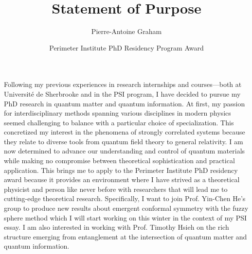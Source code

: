 \documentclass[12pt]{article}
\title{Statement of Purpose}
\author{Pierre-Antoine Graham}
\date{Perimeter Institute PhD Residency Program Award}
\begin{document}
\maketitle
\vspace{0.2cm}

Following my previous experiences in research internships and courses—both at Université de Sherbrooke and in the PSI program, I have decided to pursue my PhD research in quantum matter and quantum information. At first, my passion for interdisciplinary methods spanning various disciplines in modern physics seemed challenging to balance with a particular choice of specialization. This concretized my interest in the phenomena of strongly correlated systems because they relate to diverse tools from quantum field theory to general relativity. I am now determined to advance our understanding and control of quantum materials while making no compromise between theoretical sophistication and practical application. This brings me to apply to the Perimeter Institute PhD residency award because it provides an environment where I have strived as a theoretical physicist and person like never before with researchers that will lead me to cutting-edge theoretical research. Specifically, I want to join Prof. Yin-Chen He's group to produce new results about emergent conformal symmetry with the fuzzy sphere method which I will start working on this winter in the context of my PSI essay. I am also interested in working with Prof. Timothy Hsieh on the rich structure emerging from entanglement at the intersection of quantum matter and quantum information. \\
\end{document}
